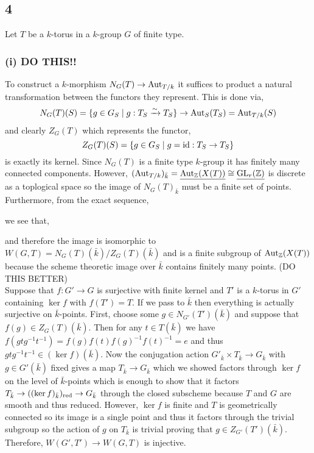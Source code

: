 \documentclass[12pt]{article}
\begin{document}
\subsection{4}

Let $T$ be a $k$-torus in a $k$-group $G$ of finite type.

\subsubsection{(i) DO THIS!!}

To construct a $k$-morphism $N_G(T) \to \mathrm{Aut}_{T/k}$ it suffices to product a natural transformation between the functors they represent. This is done via,
\[ N_G(T)(S) = \{ g \in G_S \mid g : T_S \xrightarrow{\sim} T_S \} \to \mathrm{Aut}_{S}(T_S) = \mathrm{Aut}_{T/k}(S) \]
and clearly $Z_G(T)$ which represents the functor,
\[ Z_G(T)(S) = \{ g \in G_S \mid g = \mathrm{id} : T_S \to T_S \} \]
is exactly its kernel. Since $N_G(T)$ is a finite type $k$-group it has finitely many connected components. However, $(\mathrm{Aut}_{T/k})_{\bar{k}} = \underline{\mathrm{Aut}_{\mathbb{Z}}(X(T))} \cong \underline{\mathrm{GL}_r(\mathbb{Z})}$ is discrete as a toplogical space so the image of $N_G(T)_{\bar{k}}$ must be a finite set of points. Furthermore, from the exact sequence,
\begin{center}
\end{center} 
we see that,
\begin{center}
\end{center} 
and therefore the image is isomorphic to $W(G,T) = N_G(T)(\bar{k}) / Z_G(T)(\bar{k})$ and is a finite subgroup of $\mathrm{Aut}_{\mathbb{Z}}(X(T))$ because the scheme theoretic image over $\bar{k}$ contains finitely many points.
(DO THIS BETTER)
\bigskip\\
Suppose that $f : G' \to G$ is surjective with finite kernel and $T'$ is a $k$-torus in $G'$ containing $\ker{f}$ with $f(T') = T$. If we pass to $\bar{k}$ then everything is actually surjective on $\bar{k}$-points. First, choose some $g \in N_{G'}(T')(\bar{k})$ and suppose that $f(g) \in Z_G(T)(\bar{k})$. Then for any $t \in T(\bar{k})$ we have $f(gtg^{-1}t^{-1}) = f(g) f(t) f(g)^{-1} f(t)^{-1} = e$ and thus $gtg^{-1} t^{-1} \in (\ker{f})(\bar{k})$. Now the conjugation action $G'_{\bar{k}} \times T_{\bar{k}} \to G_{\bar{k}}$ with $g \in G'(\bar{k})$ fixed gives a map $T_{\bar{k}} \to G_{\bar{k}}$ which we showed factors through $\ker{f}$ on the level of $\bar{k}$-points which is enough to show that it factors $T_{\bar{k}} \to ((\ker{f})_{\bar{k}})_{\mathrm{red}} \to G_{\bar{k}}$ through the closed subscheme because $T$ and $G$ are smooth and thus reduced. However, $\ker{f}$ is finite and $T$ is geometrically connected so its image is a single point and thus it factors through the trivial subgroup so the action of $g$ on $T_{\bar{k}}$ is trivial proving that $g \in Z_{G'}(T')(\bar{k})$. Therefore, $W(G',T') \to W(G,T)$ is injective.
\end{document}
